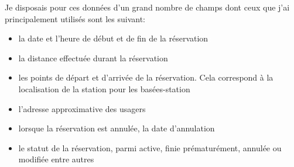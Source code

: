 \documentclass[12pt,a4paper]{article}
\theoremstyle{definition}
\begin{document}
Je disposais pour ces données d'un grand nombre de champs dont ceux que j'ai principalement utilisés sont les suivant:
\begin{itemize}
\item la date et l'heure de début et de fin de la réservation
\item la distance effectuée durant la réservation
\item les points de départ et d'arrivée de la réservation. Cela correspond à la localisation de la station pour les basées-station
\item l'adresse approximative des usagers
\item lorsque la réservation est annulée, la date d'annulation
\item le statut de la réservation, parmi active, finie prématurément, annulée ou modifiée entre autres
\end{itemize}
\end{document}
